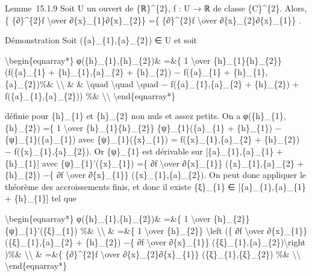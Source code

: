 \documentclass[]{article}
\begin{document}
Lemme~15.1.9 Soit U un ouvert de \{ℝ\}\^{}\{2\}, f : U → ℝ de classe
\{C\}\^{}\{2\}. Alors, \{ \{∂\}\^{}\{2\}f \textbackslash{}over
∂\{x\}\_\{1\}∂\{x\}\_\{2\}\} =\{ \{∂\}\^{}\{2\}f \textbackslash{}over
∂\{x\}\_\{2\}∂\{x\}\_\{1\}\} .

Démonstration Soit (\{a\}\_\{1\},\{a\}\_\{2\}) ∈ U et soit

\textbackslash{}begin\{eqnarray*\} φ(\{h\}\_\{1\},\{h\}\_\{2\})\& =\&\{
1 \textbackslash{}over \{h\}\_\{1\}\{h\}\_\{2\}\} (f(\{a\}\_\{1\} +
\{h\}\_\{1\},\{a\}\_\{2\} + \{h\}\_\{2\}) − f(\{a\}\_\{1\} +
\{h\}\_\{1\},\{a\}\_\{2\})\%\& \textbackslash{}\textbackslash{} \& \&
\textbackslash{}quad \textbackslash{}quad \textbackslash{}quad −
f(\{a\}\_\{1\},\{a\}\_\{2\} + \{h\}\_\{2\}) +
f(\{a\}\_\{1\},\{a\}\_\{2\})) \%\& \textbackslash{}\textbackslash{}
\textbackslash{}end\{eqnarray*\}

définie pour \{h\}\_\{1\} et \{h\}\_\{2\} non nuls et assez petits. On a
φ(\{h\}\_\{1\},\{h\}\_\{2\}) =\{ 1 \textbackslash{}over
\{h\}\_\{1\}\{h\}\_\{2\}\} \{ψ\}\_\{1\}(\{a\}\_\{1\} + \{h\}\_\{1\}) −
\{ψ\}\_\{1\}(\{a\}\_\{1\}) avec \{ψ\}\_\{1\}(\{x\}\_\{1\}) =
f(\{x\}\_\{1\},\{a\}\_\{2\} + \{h\}\_\{2\}) −
f(\{x\}\_\{1\},\{a\}\_\{2\}). Or \{ψ\}\_\{1\} est dérivable sur
{[}\{a\}\_\{1\},\{a\}\_\{1\} + \{h\}\_\{1\}{]} avec
\{ψ\}\_\{1\}'(\{x\}\_\{1\}) =\{ ∂f \textbackslash{}over ∂\{x\}\_\{1\}\}
(\{x\}\_\{1\},\{a\}\_\{2\} + \{h\}\_\{2\}) −\{ ∂f \textbackslash{}over
∂\{x\}\_\{1\}\} (\{x\}\_\{1\},\{a\}\_\{2\}). On peut donc appliquer le
théorème des accroissements finis, et donc il existe \{ξ\}\_\{1\} ∈
{[}\{a\}\_\{1\},\{a\}\_\{1\} + \{h\}\_\{1\}{]} tel que

\textbackslash{}begin\{eqnarray*\} φ(\{h\}\_\{1\},\{h\}\_\{2\})\& =\&\{
1 \textbackslash{}over \{h\}\_\{2\}\} \{ψ\}\_\{1\}'(\{ξ\}\_\{1\}) \%\&
\textbackslash{}\textbackslash{} \& =\&\{ 1 \textbackslash{}over
\{h\}\_\{2\}\} \textbackslash{}left (\{ ∂f \textbackslash{}over
∂\{x\}\_\{1\}\} (\{ξ\}\_\{1\},\{a\}\_\{2\} + \{h\}\_\{2\}) −\{ ∂f
\textbackslash{}over ∂\{x\}\_\{1\}\}
(\{ξ\}\_\{1\},\{a\}\_\{2\})\textbackslash{}right )\%\&
\textbackslash{}\textbackslash{} \& =\&\{ \{∂\}\^{}\{2\}f
\textbackslash{}over ∂\{x\}\_\{2\}∂\{x\}\_\{1\}\}
(\{ξ\}\_\{1\},\{ξ\}\_\{2\}) \%\& \textbackslash{}\textbackslash{}
\textbackslash{}end\{eqnarray*\}
\end{document}
